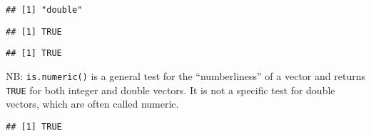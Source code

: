 \begin{Shaded}
\begin{Highlighting}[]
\StringTok{ }\NormalTok{(}\NormalTok{, }\NormalTok{, }\NormalTok{)}
\end{Highlighting}
\end{Shaded}

\begin{verbatim}
## [1] "double"
\end{verbatim}

\begin{Shaded}
\begin{Highlighting}[]
\end{Highlighting}
\end{Shaded}

\begin{verbatim}
## [1] TRUE
\end{verbatim}

\begin{Shaded}
\begin{Highlighting}[]
\end{Highlighting}
\end{Shaded}

\begin{verbatim}
## [1] TRUE
\end{verbatim}

NB: \texttt{is.numeric()} is a general test for the ``numberliness'' of
a vector and returns \texttt{TRUE} for both integer and double vectors.
It is not a specific test for double vectors, which are often called
numeric. 

\begin{Shaded}
\begin{Highlighting}[]
\end{Highlighting}
\end{Shaded}

\begin{verbatim}
## [1] TRUE
\end{verbatim}

\begin{Shaded}
\begin{Highlighting}[]
\end{Highlighting}
\end{Shaded}

